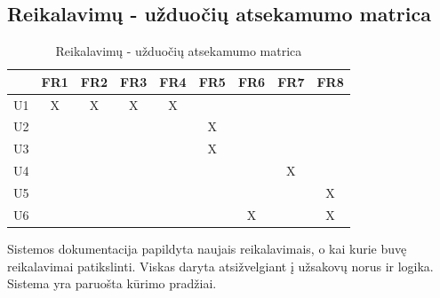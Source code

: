 \documentclass{VUMIFPSkursinis}
\begin{document}
            \subsection{Reikalavimų - užduočių atsekamumo matrica}
            \begin{table}[H]\footnotesize
                \centering
                \caption{Reikalavimų - užduočių atsekamumo matrica}
                {
                    \begin{tabular}{|c|c|c|c|c|c|c|c|c| }
                    \hline
                        & FR1 & FR2 & FR3 & FR4 & FR5 & FR6 & FR7 & FR8 \\ 
                    \hline
                     U1 & X   & X   & X   & X   &     &     &     &      \\  
                    \hline
                     U2 &     &     &     &     & X   &     &     &      \\ 
                    \hline
                     U3 &     &     &     &     & X   &     &     &      \\ 
                    \hline
                     U4 &     &     &     &     &     &     & X   &      \\ 
                    \hline
                     U5 &     &     &     &     &     &     &     & X    \\ 
                    \hline
                     U6 &     &     &     &     &     & X   &     & X    \\ 
                    \hline 
                    \end{tabular}
                }
                \label{tab:table example}
            \end{table}

			Sistemos dokumentacija papildyta naujais reikalavimais, o kai kurie buvę reikalavimai patikslinti. Viskas daryta atsižvelgiant į užsakovų norus ir logika. Sistema yra paruošta kūrimo pradžiai.
    
        \appendix  %
      
    
\end{document}
